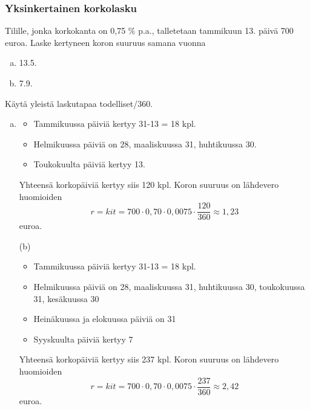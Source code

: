\documentclass{beamer}
\begin{document}
\begin{frame}
    \frametitle{Yksinkertainen korkolasku}
    \begin{esim}
        Tilille, jonka korkokanta on 0,75 \% p.a., talletetaan tammikuun 13. päivä 700 euroa. \pause
        Laske kertyneen koron suuruus samana vuonna
        \begin{enumerate}[(a)]
            \item 13.5.
            \item 7.9.
        \end{enumerate}
        Käytä yleistä laskutapaa todelliset/360.
    \end{esim}
\end{frame}

\begin{frame}
    \begin{ratkaisu}
        \begin{enumerate}[(a)]
            \item
                \begin{itemize}
                    \item Tammikuussa päiviä kertyy 31-13 = 18 kpl.
                    \item Helmikuussa päiviä on 28, maaliskuussa 31, huhtikuussa 30.
                    \item Toukokuulta päiviä kertyy 13.
                \end{itemize}
            Yhteensä korkopäiviä kertyy siis 120 kpl. Koron suuruus on lähdevero huomioiden
            \[
                r = kit = 700\cdot 0,70\cdot0,0075\cdot\frac{120}{360} \approx 1,23
            \]
            euroa.
        \end{enumerate}
    \end{ratkaisu}
\end{frame}

\begin{frame}
    \begin{ratkaisu}
        \begin{itemize}
            \item[(b)]
                \begin{itemize}
                    \item Tammikuussa päiviä kertyy 31-13 = 18 kpl.
                    \item Helmikuussa päiviä on 28, maaliskuussa 31, huhtikuussa 30, toukokuussa 31, kesäkuussa 30
                    \item Heinäkuussa ja elokuussa päiviä on 31
                    \item Syyskuulta päiviä kertyy 7
                \end{itemize}
            Yhteensä korkopäiviä kertyy siis 237 kpl. Koron suuruus on lähdevero huomioiden
            \[
                r = kit = 700\cdot 0,70\cdot0,0075\cdot\frac{237}{360} \approx 2,42
            \]
            euroa.
        \end{itemize}
    \end{ratkaisu}
\end{frame}
\end{document}
